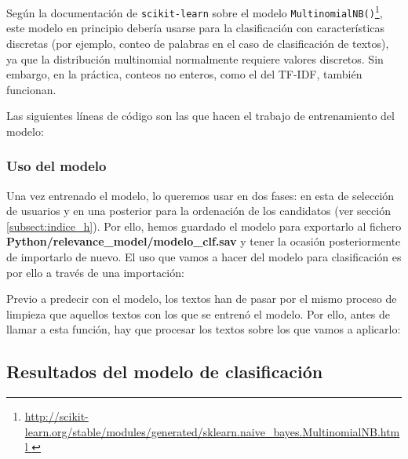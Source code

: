 Según la documentación de {\tt  scikit-learn} sobre el modelo {\tt MultinomialNB()}\footnote{\url{http://scikit-learn.org/stable/modules/generated/sklearn.naive_bayes.MultinomialNB.html }},
este modelo en principio debería usarse para la clasificación con características discretas
(por ejemplo, conteo de palabras en el caso de clasificación de textos), ya que la distribución
multinomial normalmente requiere valores discretos. Sin embargo, en la práctica, 
conteos no enteros, como el del TF-IDF, también funcionan.


Las siguientes líneas de código son las que hacen el trabajo de entrenamiento del modelo:



\subsubsection{Uso del modelo}
Una vez entrenado el modelo, lo queremos usar en dos fases: en esta de selección de 
usuarios y en una posterior para la ordenación de los candidatos (ver sección 
\ref{subsect:indice_h}). Por ello, hemos guardado el modelo para 
exportarlo al fichero {\bf Python/relevance\_model/modelo\_clf.sav}
y tener la ocasión posteriormente de importarlo de nuevo. El uso que
vamos a hacer del modelo para clasificación es por ello  a través de 
una importación:


Previo a predecir con el modelo, los textos han de pasar por el mismo proceso de 
limpieza que aquellos textos con los que se entrenó el modelo. Por ello, antes de llamar
a esta función, hay que procesar los textos sobre los que vamos a aplicarlo:


\subsection{Resultados del modelo de clasificación}

